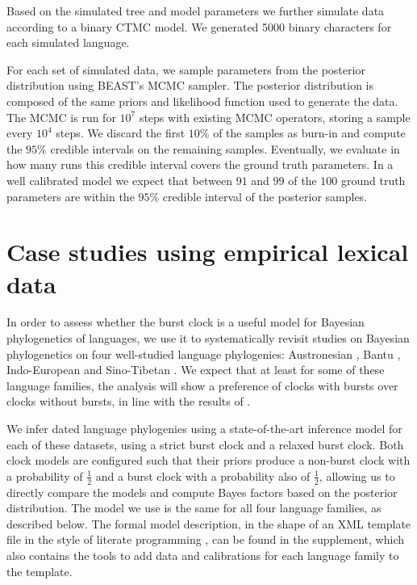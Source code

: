 \documentclass[]{rsos}%
\begin{document}
Based on the simulated tree and model parameters we further simulate data according to a binary CTMC model. We generated 5000 binary characters for each simulated language.

For each set of simulated data, we sample parameters from the posterior distribution using BEAST's MCMC sampler. The posterior distribution is composed of the same priors and likelihood function used to generate the data.
The MCMC is run for $10^7$ steps with existing MCMC operators, storing a sample every $10^4$ steps. We discard the first $10\%$ of the samples as burn-in and compute the $95\%$ credible intervals on the remaining samples. Eventually, we evaluate in how many runs this credible interval covers the ground truth parameters. In a well calibrated model we expect that between $91$ and $99$ of the $100$ ground truth parameters are within the $95\%$ credible interval of the posterior samples.

\section{Case studies using empirical lexical data}
\label{s:lexical}

In order to assess whether the burst clock is a useful model for Bayesian
phylogenetics of languages, we use it to systematically revisit studies on Bayesian phylogenetics
on four well-studied language phylogenies:
Austronesian
\parencite{gray2009language,greenhill2017evolutionary,greenhill2018population},
Bantu
\parencite{grollemund2015bantu,greenhill2018population,currie2013cultural},
Indo-European
\parencite{bouckaert2012mapping,chang2015ancestryconstrained,gray2003language,holm2017steppe,rama2018three,willems2016using}
and
Sino-Tibetan \parencite{sagart2019dated,zhang2019phylogenetic}.
We expect that at least for some of these language families, the analysis will show
a preference of clocks with bursts over clocks without bursts,
in line with the results of \textcite{atkinson2008languages}.

We infer dated language phylogenies using a state-of-the-art inference model for each of these datasets, using a strict burst clock and a relaxed burst clock.
Both clock models are configured such that their priors produce a non-burst clock with a
probability of $\frac{1}{2}$ and a burst clock with a probability also of
$\frac{1}{2}$, allowing us to directly compare the models and compute Bayes factors based on the posterior
distribution.
The model we use is the same for all four language families, as described below.
The formal model description, in the shape of an XML template file in the
style of literate programming \parencite{knuth1984literate}, can be found in the supplement,
which also contains the tools to add data and calibrations for each language
family to the template. 
\end{document}

